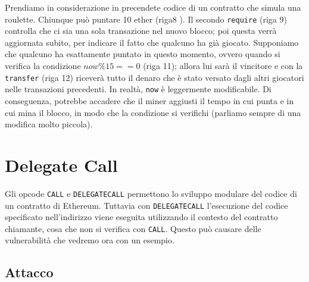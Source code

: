 Prendiamo in considerazione in precendete codice di un contratto che simula
una roulette.
Chiunque può puntare 10 ether (riga8 ).
Il secondo \verb|require| (riga 9) controlla che ci sia una
sola transazione nel nuovo blocco;
poi questa verrà aggiornata subito,
per indicare il fatto che qualcuno ha già giocato.
Supponiamo che qualcuno ha
esattamente puntato in questo
momento, ovvero quando si
verifica la condizione $now \%15 ==  0$ (riga 11); allora lui sarà
il vincitore e con la \verb|transfer| (riga 12)
riceverà tutto il denaro che è stato versato dagli altri giocatori nelle
transazioni precedenti.
In realtà, \verb|now| è leggermente modificabile.
Di conseguenza, potrebbe accadere che il
miner aggiusti il tempo in cui punta e in cui mina il blocco,
in modo che la condizione si
verifichi (parliamo sempre di una modifica molto piccola).

\section{Delegate Call}

Gli opcode \verb|CALL| e \verb|DELEGATECALL| permettono lo sviluppo modulare
del codice di un contratto di Ethereum.
Tuttavia con \verb|DELEGATECALL| l'esecuzione del codice specificato
nell'indirizzo viene eseguita utilizzando il contesto del contratto chiamante,
cosa che non si verifica con \verb|CALL|.
Questo può causare delle vulnerabilità che vedremo ora con un esempio.

\subsection{Attacco}

